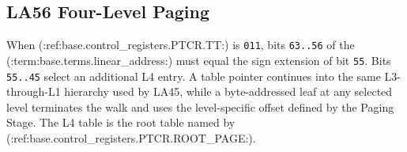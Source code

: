 \subsection{LA56 Four-Level Paging}

When (:ref:base.control_registers.PTCR.TT:) is \texttt{011}, bits \texttt{63..56} of the (:term:base.terms.linear_address:) must equal the sign extension of bit
\texttt{55}. Bits \texttt{55..45} select an additional L4 entry. A table pointer continues into the same L3-through-L1 hierarchy used by
LA45, while a byte-addressed leaf at any selected level terminates the walk and uses the level-specific offset defined by the Paging Stage.
The L4 table is the root table named by (:ref:base.control_registers.PTCR.ROOT_PAGE:).


